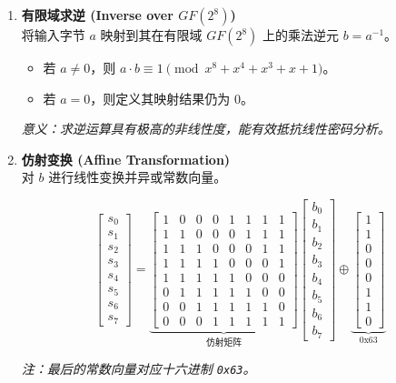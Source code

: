 \documentclass[12pt, a4paper]{article}
\begin{document}
\begin{enumerate}
    \item \textbf{有限域求逆 (Inverse over $GF(2^8)$)} \\
    将输入字节 $a$ 映射到其在有限域 $GF(2^8)$ 上的乘法逆元 $b = a^{-1}$。
    \begin{itemize}
        \item 若 $a \neq 0$，则 $a \cdot b \equiv 1 \pmod{x^8 + x^4 + x^3 + x + 1}$。
        \item 若 $a = 0$，则定义其映射结果仍为 $0$。
    \end{itemize}
    \textit{意义：求逆运算具有极高的非线性度，能有效抵抗线性密码分析。}

    \item \textbf{仿射变换 (Affine Transformation)} \\
    对 $b$ 进行线性变换并异或常数向量。
    
    \begin{tcolorbox}[mathbox]
    $$
    \begin{bmatrix} s_0 \\ s_1 \\ s_2 \\ s_3 \\ s_4 \\ s_5 \\ s_6 \\ s_7 \end{bmatrix} = 
    \underbrace{\begin{bmatrix} 
    1 & 0 & 0 & 0 & 1 & 1 & 1 & 1 \\
    1 & 1 & 0 & 0 & 0 & 1 & 1 & 1 \\
    1 & 1 & 1 & 0 & 0 & 0 & 1 & 1 \\
    1 & 1 & 1 & 1 & 0 & 0 & 0 & 1 \\
    1 & 1 & 1 & 1 & 1 & 0 & 0 & 0 \\
    0 & 1 & 1 & 1 & 1 & 1 & 0 & 0 \\
    0 & 0 & 1 & 1 & 1 & 1 & 1 & 0 \\
    0 & 0 & 0 & 1 & 1 & 1 & 1 & 1 
    \end{bmatrix}}_{\text{仿射矩阵}}
    \begin{bmatrix} b_0 \\ b_1 \\ b_2 \\ b_3 \\ b_4 \\ b_5 \\ b_6 \\ b_7 \end{bmatrix} \oplus
    \underbrace{\begin{bmatrix} 1 \\ 1 \\ 0 \\ 0 \\ 0 \\ 1 \\ 1 \\ 0 \end{bmatrix}}_{\text{0x63}}
    $$
    \end{tcolorbox}
    \textit{注：最后的常数向量对应十六进制 \texttt{0x63}。}
\end{enumerate}
\end{document}
